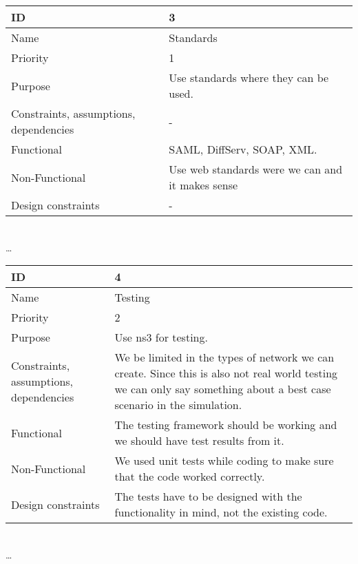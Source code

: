 \begin{center}
	\begin{tabular}{| p{4cm} | p{8cm} |}
		\hline
		ID & 3 \\
		\hline
		Name & Standards \\
		\hline
		Priority & 1 \\
		\hline
		Purpose & Use standards where they can be used. \\
		\hline 
		Constraints, assumptions, dependencies & -\\
		\hline  
		Functional & SAML, DiffServ, SOAP, XML. \\
		\hline
		Non-Functional & Use web standards were we can and it makes sense \\ 
		\hline
		Design constraints & - \\
		\hline
	\end{tabular}
	\\  \ldots  \\

	\begin{tabular}{| p{4cm} | p{8cm} |}
		\hline
		ID & 4 \\
		\hline
		Name & Testing  \\
		\hline
		Priority & 2 \\
		\hline
		Purpose & Use \gls{ns3} for testing. \\
		\hline 
		Constraints, assumptions, dependencies & We be limited in the types of network we can create. Since this is also not real world testing we can only say something about a best case scenario in the simulation.\\
		\hline  
		Functional & The testing framework should be working and we should have test results from it.\\
		\hline
		Non-Functional & We used unit tests while coding to make sure that the code worked correctly. \\ 
		\hline
		Design constraints & The tests have to be designed with the functionality in mind, not the existing code. \\
		\hline
	\end{tabular}
	\\  \ldots  \\


\end{center}
